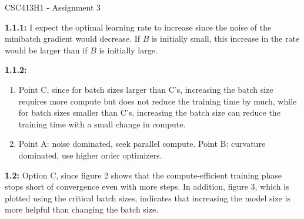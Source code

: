 \documentclass[12pt]{article}
\begin{document}
\begin{center}
{\Large CSC413H1 - Assignment 3}
\end{center}

\textbf{1.1.1:} I expect the optimal learning rate to increase since the noise of the minibatch gradient would decrease. If $B$ is initially small, this increase in the rate would be larger than if $B$ is initially large.

\textbf{1.1.2:}
\begin{enumerate}[label=(\alph*)]
    \item Point C, since for batch sizes larger than C's, increasing the batch size requires more compute but does not reduce the training time by much, while for batch sizes smaller than C's, increasing the batch size can reduce the training time with a small change in compute.
    \item Point A: noise dominated, seek parallel compute. Point B: curvature dominated, use higher order optimizers.
\end{enumerate}

\textbf{1.2:} Option C, since figure 2 shows that the compute-efficient training phase stops short of convergence even with more steps. In addition, figure 3, which is plotted using the critical batch sizes, indicates that increasing the model size is more helpful than changing the batch size.
\end{document}
